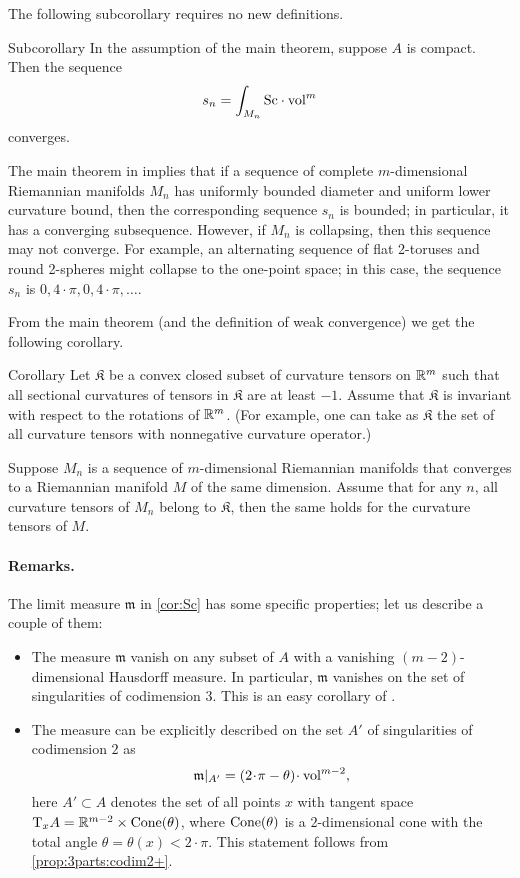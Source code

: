 The following subcorollary requires no new definitions.

\begin{thm}{Subcorollary}\label{cor:cor:Sc}
In the assumption of the main theorem, suppose $A$ is compact.
Then the sequence
\[s_n=\int_{M_n}\Sc \cdot\vol^m\]
converges.
\end{thm}

The main theorem in \cite{petrunin-SC} implies that if a sequence of complete $m$-dimensional Riemannian  manifolds $M_n$ has uniformly bounded diameter and uniform lower curvature bound, then 
the corresponding sequence $s_n$ is bounded;
in particular, it has a converging subsequence.
However, if $M_n$ is collapsing, then this sequence may not converge.
For example, an alternating sequence of flat 2-toruses and round 2-spheres might collapse to the one-point space; in this case, the sequence $s_n$ is $0,4\cdot\pi,0,4\cdot\pi,\dots$.

From the main theorem (and the definition of weak convergence) we get the following corollary.

\begin{thm}{Corollary}
Let $\mathfrak{K}$ be a convex closed subset of curvature tensors on $\mathbb{R}^m$ 
such that 
all sectional curvatures of tensors in $\mathfrak{K}$ are at least $-1$.
Assume that $\mathfrak{K}$ is invariant with respect to the rotations of $\mathbb{R}^m$.
(For example, one can take as $\mathfrak{K}$ the set of all curvature tensors with nonnegative curvature operator.)

Suppose $M_n$ is a sequence of $m$-dimensional Riemannian manifolds that converges to a Riemannian manifold $M$ of the same dimension.
Assume that for any $n$, all curvature tensors of $M_n$ belong to $\mathfrak{K}$, 
then the same holds for the curvature tensors of $M$.
\end{thm}



\paragraph{Remarks.}
The limit measure $\mathfrak m$ in \ref{cor:Sc} has some specific properties;
let us describe a couple of them:
\begin{itemize}
\item The measure $\mathfrak m$ vanish on any subset of $A$ with a vanishing $(m-2)$-dimensional Hausdorff measure.
In particular, $\mathfrak m$ vanishes on the set of singularities of codimension 3.
This is an easy corollary of \cite{petrunin-SC}.

\item The measure can be explicitly described on the set $A'$ of singularities
of codimension $2$ as 
$$\mathfrak m|_{A'}=(2\cdot \pi-\theta)\cdot \vol^{m-2},$$
here $A'\subset A$
denotes the set of all points $x$ with tangent space
$\T_xA\zz=\R^{m-2}\zz\times \Cone(\theta)$,
where $\operatorname{Cone}(\theta)$ is a $2$-dimensional cone
with the total angle $\theta=\theta(x)<2\cdot\pi$.
This statement follows from \ref{prop:3parts:codim2+}.
\end{itemize}

